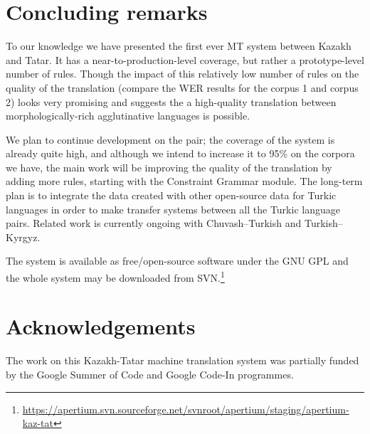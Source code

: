 \documentclass[11pt]{article}
\begin{document}



\section{Concluding remarks}
\label{sec:conc}

To our knowledge we have presented the first ever MT system between Kazakh and Tatar. It has a near-to-production-level
coverage, but rather a prototype-level number of rules. Though the impact of this relatively low number of rules on the
quality of the translation (compare the WER results for the corpus 1 and corpus 2) looks very promising and suggests
the a high-quality translation between morphologically-rich agglutinative languages is possible.

We plan to continue development on the pair; the coverage of the system is already quite high, and although we intend to
increase it to 95\% on the corpora we have, the main work will be improving the quality of the translation by adding
more rules, starting with the Constraint Grammar module.
The long-term plan is to integrate the data created with other open-source data for Turkic languages in order to make
transfer systems between all the Turkic language pairs.  Related work is currently ongoing with Chuvash--Turkish and Turkish--Kyrgyz.

The system is available as free/open-source software under the GNU GPL and the whole system may be downloaded
from SVN.\footnote{\url{https://apertium.svn.sourceforge.net/svnroot/apertium/staging/apertium-kaz-tat}}

\section*{Acknowledgements}

The work on this Kazakh-Tatar machine translation system was partially funded by the Google Summer of Code and Google Code-In programmes.

%
%

%

\end{document}
